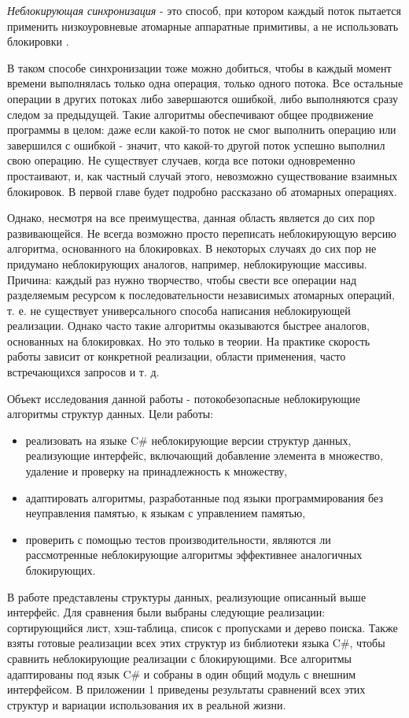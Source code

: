 \documentclass[12pt]{article}
\begin{document}
{			\par \textit{Неблокирующая синхронизация} - это способ, при котором каждый поток пытается применить низкоуровневые атомарные аппаратные примитивы, а не использовать блокировки \cite{introLockFree}. 
			\par В таком способе синхронизации тоже можно добиться, чтобы в каждый момент времени выполнялась только одна операция, только одного потока. Все остальные операции в других потоках либо завершаются ошибкой, либо выполняются сразу следом за предыдущей. Такие алгоритмы обеспечивают общее продвижение программы в целом: даже если какой-то поток не смог выполнить операцию или завершился с ошибкой - значит, что какой-то другой поток успешно выполнил свою операцию. Не существует случаев, когда все потоки одновременно простаивают, и, как частный случай этого, невозможно существование взаимных блокировок. В первой главе будет подробно рассказано об атомарных операциях. 
			\par Однако, несмотря на все преимущества, данная область является до сих пор развивающейся. Не всегда возможно просто переписать неблокирующую версию алгоритма, основанного на блокировках. В некоторых случаях до сих пор не придумано неблокирующих аналогов, например, неблокирующие массивы. Причина: каждый раз нужно творчество, чтобы свести все операции над разделяемым ресурсом к последовательности независимых атомарных операций, т. е. не существует универсального способа написания неблокирующей реализации. Однако часто такие алгоритмы оказываются быстрее аналогов, основанных на блокировках. Но это только в теории. На практике скорость работы зависит от конкретной реализации, области применения, часто встречающихся запросов и т. д.
			\par Объект исследования данной работы - потокобезопасные неблокирующие алгоритмы структур данных. Цели работы:
			\begin{itemize}
				\item реализовать на языке C\# неблокирующие версии структур данных, реализующие интерфейс, включающий добавление элемента в множество, удаление и проверку на принадлежность к множеству,
				\item адаптировать алгоритмы, разработанные под языки программирования без неуправления памятью, к языкам с управлением памятью,
				\item проверить с помощью тестов производительности, являются ли рассмотренные неблокирующие алгоритмы эффективнее аналогичных блокирующих.
			\end{itemize}
			\par В работе представлены структуры данных, реализующие описанный выше интерфейс. Для сравнения были выбраны следующие реализации: сортирующийся лист, хэш-таблица, список с пропусками и дерево поиска. Также взяты готовые реализации всех этих структур из библиотеки языка C\#, чтобы сравнить неблокирующие реализации с блокирующими. Все алгоритмы адаптированы под язык C\# и собраны в один общий модуль с внешним интерфейсом. В приложении 1 приведены результаты сравнений всех этих структур и вариации использования их в реальной жизни.
		
}
\end{document}
